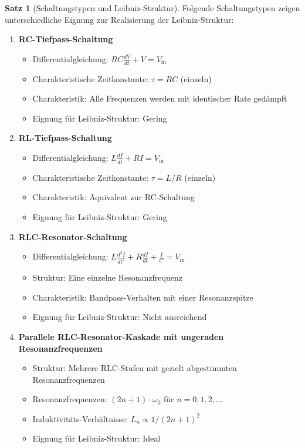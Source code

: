 \documentclass[a4paper,12pt,twoside]{report}
\theoremstyle{definition}
\newtheorem{satz}{Satz}
\begin{document}
\begin{satz}[Schaltungstypen und Leibniz-Struktur]
Folgende Schaltungstypen zeigen unterschiedliche Eignung zur Realisierung der Leibniz-Struktur:

\begin{enumerate}
	\item \textbf{RC-Tiefpass-Schaltung}
		\begin{itemize}
			\item Differentialgleichung: $RC \frac{dV}{dt} + V = V_{\text{in}}$
			\item Charakteristische Zeitkonstante: $\tau = RC$ (einzeln)
			\item Charakteristik: Alle Frequenzen werden mit identischer Rate gedämpft
			\item Eignung für Leibniz-Struktur: Gering
		\end{itemize}
	
	\item \textbf{RL-Tiefpass-Schaltung}
		\begin{itemize}
			\item Differentialgleichung: $L \frac{dI}{dt} + RI = V_{\text{in}}$
			\item Charakteristische Zeitkonstante: $\tau = L/R$ (einzeln)
			\item Charakteristik: Äquivalent zur RC-Schaltung
			\item Eignung für Leibniz-Struktur: Gering
		\end{itemize}
	
	\item \textbf{RLC-Resonator-Schaltung}
		\begin{itemize}
			\item Differentialgleichung: $L \frac{d^2 I}{dt^2} + R \frac{dI}{dt} + \frac{I}{C} = V_{\text{in}}$
			\item Struktur: Eine einzelne Resonanzfrequenz
			\item Charakteristik: Bandpass-Verhalten mit einer Resonanzspitze
			\item Eignung für Leibniz-Struktur: Nicht ausreichend
		\end{itemize}
	
	\item \textbf{Parallele RLC-Resonator-Kaskade mit ungeraden Resonanzfrequenzen}
		\begin{itemize}
			\item Struktur: Mehrere RLC-Stufen mit gezielt abgestimmten Resonanzfrequenzen
			\item Resonanzfrequenzen: $(2n+1) \cdot \omega_0$ für $n = 0, 1, 2, \ldots$
			\item Induktivitäts-Verhältnisse: $L_n \propto 1/(2n+1)^2$
			\item Eignung für Leibniz-Struktur: Ideal
		\end{itemize}
\end{enumerate}
\end{satz}
\end{document}
